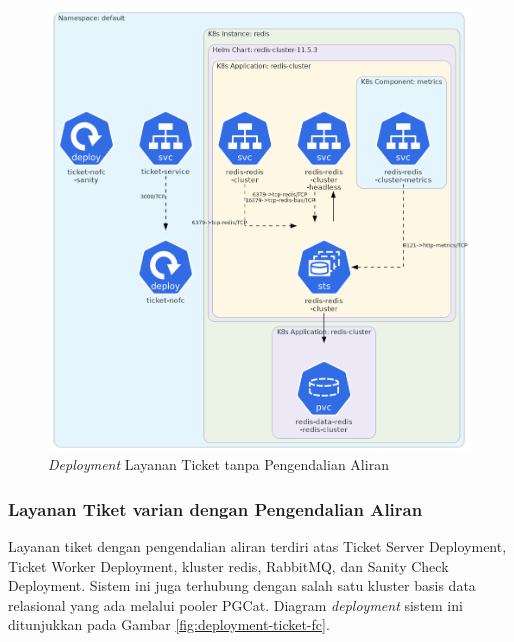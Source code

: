 \begin{figure}[htbp]
    \centering
    \includegraphics[width=1\textwidth]{resources/chapter-4/ticket-nofc.png}
    \caption{\textit{Deployment} Layanan Ticket tanpa Pengendalian Aliran}
    \label{fig:deployment-ticket-nofc}
\end{figure}

\pagebreak

\subsubsection{Layanan Tiket varian dengan Pengendalian Aliran}

Layanan tiket dengan pengendalian aliran terdiri atas Ticket Server Deployment, Ticket Worker Deployment, kluster redis, RabbitMQ, dan Sanity Check Deployment. Sistem ini juga terhubung dengan salah satu kluster basis data relasional yang ada melalui pooler PGCat. Diagram \textit{deployment} sistem ini ditunjukkan pada Gambar \ref{fig:deployment-ticket-fc}.

